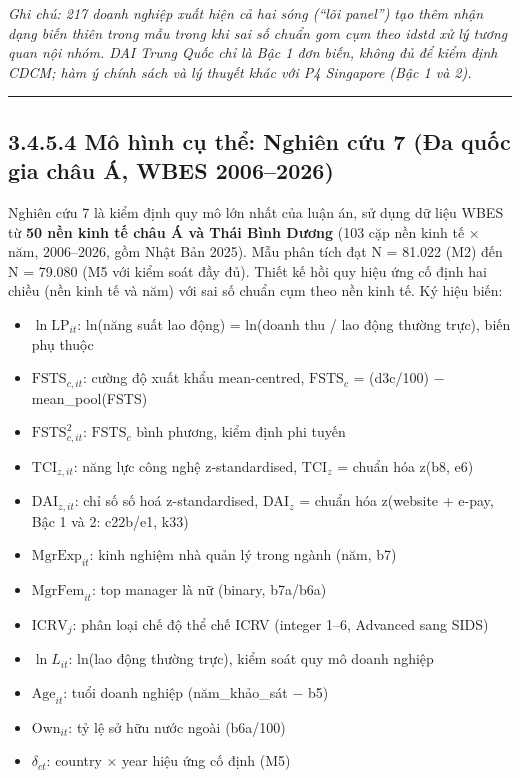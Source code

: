 \documentclass[
  a4paper,
  13pt]{extreport}
\providecommand{\tightlist}{%
  \setlength{\itemsep}{0pt}\setlength{\parskip}{0pt}}
\begin{document}
\emph{Ghi chú: 217 doanh nghiệp xuất hiện cả hai sóng (``lõi panel'')
tạo thêm nhận dạng biến thiên trong mẫu trong khi sai số chuẩn gom cụm
theo idstd xử lý tương quan nội nhóm. DAI Trung Quốc chỉ là Bậc 1 đơn
biến, không đủ để kiểm định CDCM; hàm ý chính sách và lý thuyết khác với
P4 Singapore (Bậc 1 và 2).}

\begin{center}\rule{0.5\linewidth}{0.5pt}\end{center}

\hypertarget{muxf4-huxecnh-cux1ee5-thux1ec3-nghiuxean-cux1ee9u-7-ux111a-quux1ed1c-gia-chuxe2u-uxe1-wbes-20062026}{%
\subsection{3.4.5.4 Mô hình cụ thể: Nghiên cứu 7 (Đa quốc gia châu Á,
WBES
2006--2026)}\label{muxf4-huxecnh-cux1ee5-thux1ec3-nghiuxean-cux1ee9u-7-ux111a-quux1ed1c-gia-chuxe2u-uxe1-wbes-20062026}}

Nghiên cứu 7 là kiểm định quy mô lớn nhất của luận án, sử dụng dữ liệu
WBES từ \textbf{50 nền kinh tế châu Á và Thái Bình Dương} (103 cặp nền
kinh tế × năm, 2006--2026, gồm Nhật Bản 2025). Mẫu phân tích đạt N =
81.022 (M2) đến N = 79.080 (M5 với kiểm soát đầy đủ). Thiết kế hồi quy
hiệu ứng cố định hai chiều (nền kinh tế và năm) với sai số chuẩn cụm
theo nền kinh tế. Ký hiệu biến:

\begin{itemize}
\tightlist
\item
  \textbf{\(\ln\mathrm{LP}_{it}\)}: ln(năng suất lao động) = ln(doanh
  thu / lao động thường trực), biến phụ thuộc
\item
  \textbf{\(\mathrm{FSTS}_{c,it}\)}: cường độ xuất khẩu mean-centred,
  \(\mathrm{FSTS}_{c}\) = (d3c/100) − mean\_pool(FSTS)
\item
  \textbf{\(\mathrm{FSTS}_{c,it}^{2}\)}: \(\mathrm{FSTS}_{c}\) bình
  phương, kiểm định phi tuyến
\item
  \textbf{\(\mathrm{TCI}_{z,it}\)}: năng lực công nghệ z-standardised,
  \(\mathrm{TCI}_{z}\) = chuẩn hóa z(b8, e6)
\item
  \textbf{\(\mathrm{DAI}_{z,it}\)}: chỉ số số hoá z-standardised,
  \(\mathrm{DAI}_{z}\) = chuẩn hóa z(website + e-pay, Bậc 1 và 2:
  c22b/e1, k33)
\item
  \textbf{\(\mathrm{MgrExp}_{it}\)}: kinh nghiệm nhà quản lý trong ngành
  (năm, b7)
\item
  \textbf{\(\mathrm{MgrFem}_{it}\)}: top manager là nữ (binary, b7a/b6a)
\item
  \textbf{\(\mathrm{ICRV}_{j}\)}: phân loại chế độ thể chế ICRV (integer
  1--6, Advanced sang SIDS)
\item
  \textbf{\(\ln L_{it}\)}: ln(lao động thường trực), kiểm soát quy mô
  doanh nghiệp
\item
  \textbf{\(\mathrm{Age}_{it}\)}: tuổi doanh nghiệp (năm\_khảo\_sát −
  b5)
\item
  \textbf{\(\mathrm{Own}_{it}\)}: tỷ lệ sở hữu nước ngoài (b6a/100)
\item
  \textbf{\(\delta_{ct}\)}: country × year hiệu ứng cố định (M5)
\end{itemize}
\end{document}
